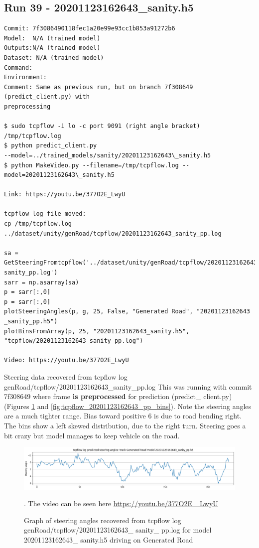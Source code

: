 \subsection{Run 39 - 20201123162643\_sanity.h5}
\begin{verbatim}
Commit: 7f3086490118fec1a20e99e93cc1b853a91272b6
Model:  N/A (trained model)
Outputs:N/A (trained model)
Dataset: N/A (trained model)
Command: 
Environment: 
Comment: Same as previous run, but on branch 7f308649 (predict_client.py) with
preprocessing

$ sudo tcpflow -i lo -c port 9091 (right angle bracket) /tmp/tcpflow.log
$ python predict_client.py
--model=../trained_models/sanity/20201123162643\_sanity.h5
$ python MakeVideo.py --filename=/tmp/tcpflow.log --model=20201123162643\_sanity.h5

Link: https://youtu.be/377O2E_LwyU

tcpflow log file moved:
cp /tmp/tcpflow.log ../dataset/unity/genRoad/tcpflow/20201123162643_sanity_pp.log

sa = GetSteeringFromtcpflow('../dataset/unity/genRoad/tcpflow/20201123162643_
sanity_pp.log')
sarr = np.asarray(sa)
p = sarr[:,0]
p = sarr[:,0]  
plotSteeringAngles(p, g, 25, False, "Generated Road", "20201123162643
_sanity_pp.h5")
plotBinsFromArray(p, 25, "20201123162643_sanity.h5",
"tcpflow/20201123162643_sanity_pp.log")

Video: https://youtu.be/377O2E_LwyU
\end{verbatim}

Steering data recovered from tcpflow log genRoad/tcpflow/20201123162643\_sanity\_pp.log
This was running with commit 7f308649 where frame \textbf{is preprocessed} for prediction (predict\_ client.py) (Figures  \ref{fig:tcpflow_20201123162643_pp_graph} and  \ref{fig:tcpflow_20201123162643_pp_bins}). 
Note the steering angles are a much tighter range. Bias toward positive 6 is due to road bending right.
The bins show a left skewed distribution, due to the right turn. Steering goes a bit crazy but model
manages to keep vehicle on the road.

\begin{figure}[ht]
 \centering 
 \includegraphics[width=\textwidth]{Figures/tcpflow_20201123162643_sanity_pp_graph.png}
 \caption{Graph of steering angles recovered from tcpflow log genRoad/tcpflow/20201123162643\_ sanity\_  pp.log for model 20201123162643\_ sanity.h5 driving on Generated Road}. The video can be seen here \href{https://youtu.be/377O2E\_ LwyU}{https://youtu.be/377O2E\_ LwyU}
 \label{fig:tcpflow_20201123162643_pp_graph}
\end{figure}

